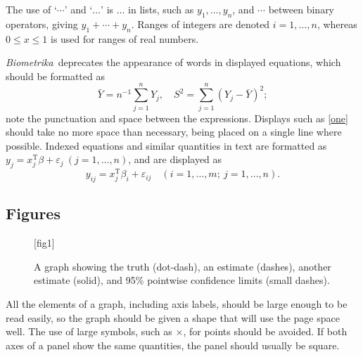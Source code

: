 \documentclass[lineno]{biometrika}
\def\Bka{{\it Biometrika}}
\def\T{{ \mathrm{\scriptscriptstyle T} }}
\def\v{{\varepsilon}}
\begin{document}
The use of `$\cdots$' and `$\ldots$' is  $\ldots$ in lists, such as $y_1,\ldots,y_n$, and $\cdots$ between binary operators,  giving $y_1+\cdots+y_n$.
Ranges of integers are denoted $i=1,\ldots, n$, whereas $0\leq x\leq 1$ is used for ranges of real numbers.  %

\Bka\ deprecates the appearance of words in displayed equations, which should be formatted as
\begin{equation}
\label{one}
\bar Y = n^{-1} \sum_{j=1}^n Y_j,\quad S^2 = \sum_{j=1}^n (Y_j-\bar Y)^2;
\end{equation}
note the punctuation and space between the expressions. Displays such as \eqref{one} should take no more space than necessary, being placed on a single line where possible. Indexed equations and similar quantities in text are formatted as
$y_j = x_j^\T\beta + \v_j\ (j=1,\ldots, n)$, and are displayed as
\[
y_{ij} = x_j^\T\beta_i + \v_{ij}\quad (i=1,\ldots, m;\ j=1,\ldots, n).
\]


\subsection{Figures}


\begin{figure}
\figurebox{20pc}{25pc}{}[fig1]
\caption{A graph showing the truth (dot-dash), an estimate (dashes), another estimate (solid), and 95\% pointwise confidence limits (small dashes).}
\label{fig1}
\end{figure}


All the elements of a graph, including axis labels, should be large enough to be read easily, so the graph should be given a shape that will use the page space well. The use of large symbols, such as $\times$, for points should be avoided. If both axes of a panel show the same quantities, the panel should usually be square.  
\end{document}
